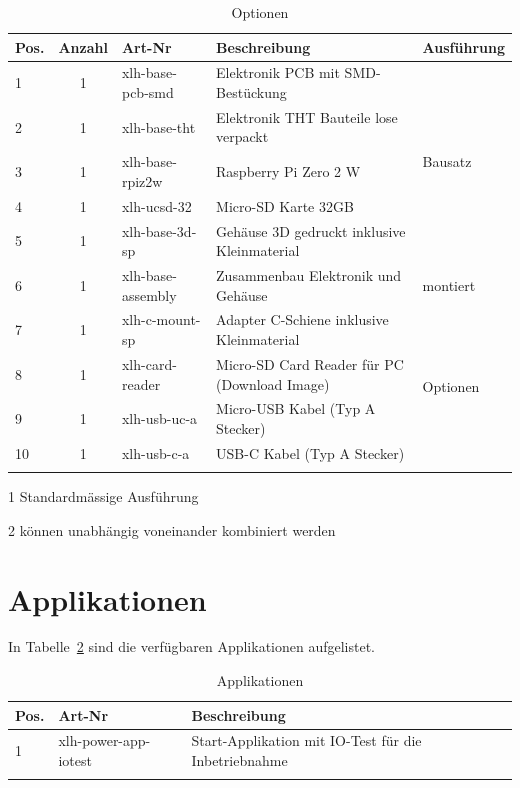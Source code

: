 \documentclass[10pt]{datasheet}
\begin{document}
\begin{table}[h]
\begin{threeparttable}
\caption{Optionen \xlhPlattformID}
    \begin{tabularx}{\textwidth}{l | c | l | l | X}

        \thickhline
        \textbf{Pos.} & \textbf{Anzahl} & \textbf{Art-Nr} & \textbf{Beschreibung} & \textbf{Ausführung} \\
        \hline
        1 & 1 & xlh-base-pcb-smd & Elektronik PCB mit SMD-Bestückung & \multirow{5}{*}{Bausatz\tnote{1}}  \\
        2 & 1 & xlh-base-tht & Elektronik THT Bauteile lose verpackt &  \\
        3 & 1 & xlh-base-rpiz2w & Raspberry Pi Zero 2 W & \\
        4 & 1 & xlh-ucsd-32 & Micro-SD Karte 32GB & \\
        5 & 1 & xlh-base-3d-sp & Gehäuse 3D gedruckt inklusive Kleinmaterial & \\
        \hline
        6 & 1 & xlh-base-assembly & Zusammenbau Elektronik und Gehäuse & montiert \\
        \hline
        7 & 1 & xlh-c-mount-sp & Adapter C-Schiene inklusive Kleinmaterial & \multirow{4}{*}{Optionen\tnote{2}} \\
        8 & 1 & xlh-card-reader & Micro-SD Card Reader für PC (Download Image) &  \\
        9 & 1 & xlh-usb-uc-a & Micro-USB Kabel (Typ A Stecker) &  \\
        10 & 1 & xlh-usb-c-a & USB-C Kabel (Typ A Stecker) &  \\
        \thickhline
    \end{tabularx}
\begin{tablenotes}
\item[1]{Standardmässige Ausführung}
\item[2]{können unabhängig voneinander kombiniert werden}
\end{tablenotes}
\label{tab:optionen}
\end{threeparttable}
\end{table}


\section{Applikationen}
In Tabelle~\ref{tab:applikationen} sind die verfügbaren Applikationen aufgelistet.

\begin{table}[h]
\begin{threeparttable}
\caption{Applikationen \xlhPlattformID}
    \begin{tabularx}{\textwidth}{l | l | l }
        \thickhline
        \textbf{Pos.} & \textbf{Art-Nr} & \textbf{Beschreibung} \\
        \hline
        1 & xlh-power-app-iotest & Start-Applikation mit IO-Test für die Inbetriebnahme \\
        \thickhline
    \end{tabularx}

\label{tab:applikationen}
\end{threeparttable}
\end{table}
\end{document}

